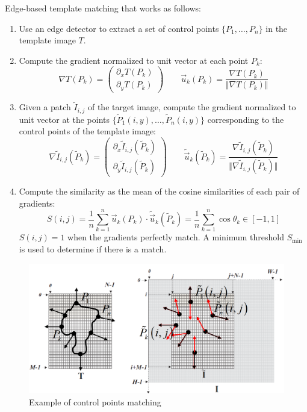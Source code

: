Edge-based template matching that works as follows:
\begin{enumerate}
    \item Use an edge detector to extract a set of control points $\{ P_1, \dots, P_n \}$ in the template image $T$.
    \item Compute the gradient normalized to unit vector at each point $P_k$:
        \[ \nabla T(P_k) = \begin{pmatrix} \partial_x T(P_k) \\ \partial_y T(P_k) \end{pmatrix} \hspace{2em} \vec{u}_k(P_k) = \frac{\nabla T(P_k)}{\Vert \nabla T(P_k) \Vert} \]
    \item Given a patch $\tilde{I}_{i,j}$ of the target image, 
        compute the gradient normalized to unit vector at the points $\{ \tilde{P}_1(i, y), \dots, \tilde{P}_n(i, y) \}$ 
        corresponding to the control points of the template image:
        \[ 
            \nabla \tilde{I}_{i,j}(\tilde{P}_k) = \begin{pmatrix} \partial_x \tilde{I}_{i,j}(\tilde{P}_k) \\ \partial_y \tilde{I}_{i,j}(\tilde{P}_k) \end{pmatrix} \hspace{2em} 
            \tilde{\vec{u}}_k(\tilde{P}_k) = \frac{\nabla \tilde{I}_{i,j}(\tilde{P}_k)}{\Vert \nabla \tilde{I}_{i,j}(\tilde{P}_k) \Vert} 
        \]
    \item Compute the similarity as the mean of the cosine similarities of each pair of gradients:
        \[ S(i, j) = \frac{1}{n} \sum_{k=1}^{n} \vec{u}_k(P_k) \cdot \tilde{\vec{u}}_k(\tilde{P}_k) = \frac{1}{n} \sum_{k=1}^{n} \cos \theta_k \in [-1, 1] \]
        $S(i, j) = 1$ when the gradients perfectly match. A minimum threshold $S_\text{min}$ is used to determine if there is a match.
\end{enumerate}

\begin{figure}[H]
    \centering
    \includegraphics[width=0.5\linewidth]{./img/shape_based_matching.png}
    \caption{Example of control points matching}
\end{figure}


